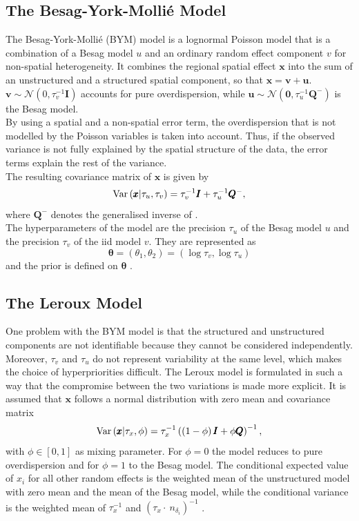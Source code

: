 \subsection{The Besag-York-Mollié Model}
The Besag-York-Mollié (BYM) model is a lognormal Poisson model that is a combination of a Besag model $u$ and an ordinary random effect component $v$ for non-spatial heterogeneity. It combines the regional spatial effect $\pmb{x}$ into the sum of an unstructured and a structured spatial component, so that $\pmb{x}=\pmb{v}+\pmb{u}$.\\
$\pmb{v}\sim\mathcal{N}\left(0,\tau_v^{-1}\pmb{I}\right)$ accounts for pure overdispersion, while $\pmb{u}\sim\mathcal{N}\left(\pmb{0}, \tau_u^{-1}\pmb{Q}^{-}\right)$ is the Besag model. \\
By using a spatial and a non-spatial error term, the overdispersion that is not modelled by the Poisson variables is taken into account. Thus, if the observed variance is not fully explained by the spatial structure of the data, the error terms explain the rest of the variance. \\
The resulting covariance matrix of $\pmb{x}$ is given by
\begin{equation}
    \hbox{Var}\left(\pmb{x}|\tau_u,\tau_v\right)=\tau_v^{-1}\pmb{I}+\tau_u^{-1}\pmb{Q}^{-},
\end{equation}
where $\pmb{Q}^{-}$ denotes the generalised inverse of . \\
The hyperparameters of the model are the precision $\tau_u$ of the Besag model $u$ and the precision $\tau_v$ of the iid model $v$. They are represented as
\begin{equation}
    \pmb{\theta}=\left(\theta_1, \theta_2\right)=\left(\log\tau_v,\log\tau_u\right)
\end{equation}
and the prior is defined on $\pmb{\theta}$ \autocite[][]{besag1991bayesian, riebler2016intuitive}.
\subsection{The Leroux Model}
One problem with the BYM model is that the structured and unstructured components are not identifiable because they cannot be considered independently. Moreover, $\tau_v$ and $\tau_u$ do not represent variability at the same level, which makes the choice of hyperpriorities difficult. The Leroux model is formulated in such a way that the compromise between the two variations is made more explicit. It is assumed that $\pmb{x}$ follows a normal distribution with zero mean and covariance matrix
\begin{equation}
    \hbox{Var}\left(\pmb{x}|\tau_x,\phi\right)=\tau_x^{-1}\left(\left(1-\phi\right)\pmb{I}+\phi\pmb{Q}\right)^{-1},
\end{equation}
with $\phi\in\left[0,1\right]$ as mixing parameter. For $\phi=0$ the model reduces to pure overdispersion and for $\phi=1$ to the Besag model. The conditional expected value of $x_i$ for all other random effects is the weighted mean of the unstructured model with zero mean and the mean of the Besag model, while the conditional variance is the weighted mean of $\tau_x^{-1}$ and $\left(\tau_x\cdot\ n_{\delta_i}\right)^{-1}$ \autocite[][]{leroux2000estimation, riebler2016intuitive}.
